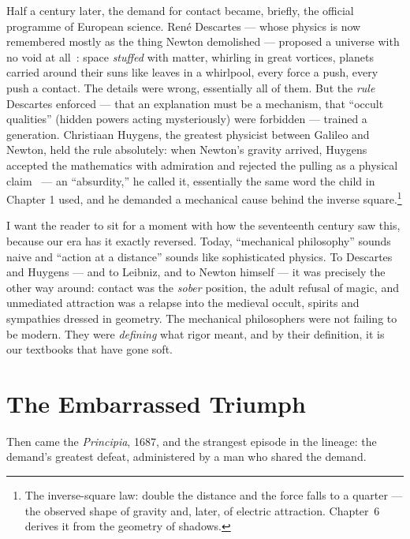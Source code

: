 \documentclass[fontsize=11pt,paper=a4,pagesize=auto,parskip=half-]{scrbook}
\begin{document}
Half a century later, the demand for contact became, briefly, the official programme of European science. René Descartes --- whose physics is now remembered mostly as the thing Newton demolished --- proposed a universe with no void at all~\cite{descartes1644}: space \emph{stuffed} with matter, whirling in great vortices, planets carried around their suns like leaves in a whirlpool, every force a push, every push a contact. The details were wrong, essentially all of them. But the \emph{rule} Descartes enforced --- that an explanation must be a mechanism, that ``occult qualities'' (hidden powers acting mysteriously) were forbidden --- trained a generation. Christiaan Huygens, the greatest physicist between Galileo and Newton, held the rule absolutely: when Newton's gravity arrived, Huygens accepted the mathematics with admiration and rejected the pulling as a physical claim~\cite{huygens1690} --- an ``absurdity,'' he called it, essentially the same word the child in Chapter 1 used, and he demanded a mechanical cause behind the inverse square.\footnote{The inverse-square law: double the distance and the force falls to a quarter --- the observed shape of gravity and, later, of electric attraction. Chapter~6 derives it from the geometry of shadows.}

I want the reader to sit for a moment with how the seventeenth century saw this, because our era has it exactly reversed. Today, ``mechanical philosophy'' sounds naive and ``action at a distance'' sounds like sophisticated physics. To Descartes and Huygens --- and to Leibniz, and to Newton himself --- it was precisely the other way around: contact was the \emph{sober} position, the adult refusal of magic, and unmediated attraction was a relapse into the medieval occult, spirits and sympathies dressed in geometry. The mechanical philosophers were not failing to be modern. They were \emph{defining} what rigor meant, and by their definition, it is our textbooks that have gone soft.

\section{The Embarrassed Triumph}

Then came the \emph{Principia}, 1687, and the strangest episode in the lineage: the demand's greatest defeat, administered by a man who shared the demand.
\end{document}

